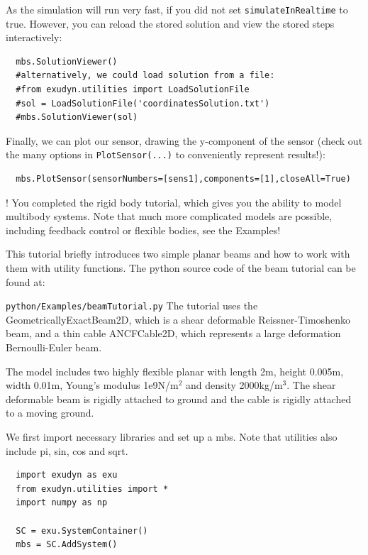 \noindent As the simulation will run very fast, if you did not set \texttt{simulateInRealtime} to true. However, you can reload the stored solution and view the stored steps interactively:
\pythonstyle\begin{lstlisting}
  mbs.SolutionViewer()
  #alternatively, we could load solution from a file:
  #from exudyn.utilities import LoadSolutionFile
  #sol = LoadSolutionFile('coordinatesSolution.txt')
  #mbs.SolutionViewer(sol)
\end{lstlisting}

\noindent Finally, we can plot our sensor, drawing the y-component of the sensor (check out the many options in \texttt{PlotSensor(...)} to conveniently represent results!):
\pythonstyle\begin{lstlisting}
  mbs.PlotSensor(sensorNumbers=[sens1],components=[1],closeAll=True)
\end{lstlisting}

\noindent {}! You completed the rigid body tutorial, which gives you the ability to model multibody systems. Note that much more complicated models are possible, including feedback control or flexible bodies, see the Examples!


This tutorial briefly introduces two simple planar beams and how to work with them with utility functions.
The python source code of the beam tutorial can be found at:
\bi
  \item[] \texttt{python/Examples/beamTutorial.py}
\ei
The tutorial uses the GeometricallyExactBeam2D, which is a shear deformable Reissner-Timoshenko beam, and a thin cable ANCFCable2D, which represents a large deformation Bernoulli-Euler beam.

\noindent The model includes two highly flexible planar with length 2m, height 0.005m, width 0.01m, 
Young's modulus 1e9N/m$^2$ and density 2000kg/m$^3$.
The shear deformable beam is rigidly attached to ground and the cable is rigidly attached to a moving ground.

\noindent We first import necessary libraries and set up a mbs. Note that utilities also include pi, sin, cos and sqrt.
\pythonstyle\begin{lstlisting}
  import exudyn as exu
  from exudyn.utilities import *
  import numpy as np

  SC = exu.SystemContainer()
  mbs = SC.AddSystem()
\end{lstlisting}

